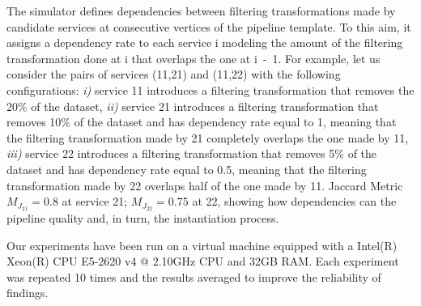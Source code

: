   The simulator defines dependencies between filtering transformations made by candidate services at consecutive vertices of the pipeline template.
  To this aim, it assigns a dependency rate to each service \si{i} modeling the amount of the filtering transformation done at \si{i} that overlaps the one at \si{i-1}.
  For example, let us consider the pairs of services (\si{11},\si{21}) and (\si{11},\si{22}) with the following configurations: \emph{i)} service \si{11} introduces a filtering transformation that removes the 20\% of the dataset, \emph{ii)} service \si{21} introduces a filtering transformation that removes 10\% of the dataset and has dependency rate equal to 1, meaning that the filtering transformation made by \si{21} completely overlaps the one made by \si{11}, \emph{iii)} service \si{22} introduces a filtering transformation that removes 5\% of the dataset and has dependency rate equal to 0.5, meaning that the filtering transformation made by \si{22} overlaps half of the one made by \si{11}. Jaccard Metric $M_{J_{21}}$$=$0.8 at service \si{21}; $M_{J_{22}}$$=$0.75 at \si{22}, showing how dependencies can the pipeline quality and, in turn, the instantiation process.

  Our experiments have been run on a virtual machine equipped with a Intel(R) Xeon(R) CPU E5-2620 v4 @ 2.10GHz CPU and 32GB RAM.
  Each experiment was repeated 10 times and the results averaged to improve the reliability of findings.

